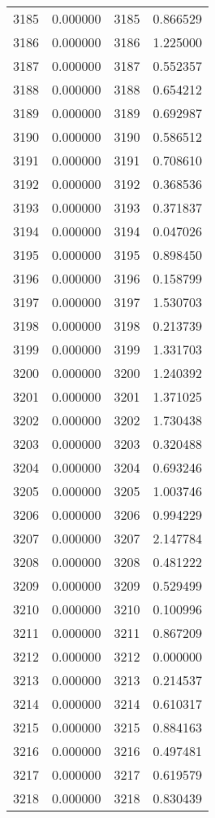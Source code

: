 \documentclass[12pt]{article}
\begin{document}
\begin{longtable}{@{}cccc@{}}
3185 & 0.000000 & 3185 & 0.866529 \\
3186 & 0.000000 & 3186 & 1.225000 \\
3187 & 0.000000 & 3187 & 0.552357 \\
3188 & 0.000000 & 3188 & 0.654212 \\
3189 & 0.000000 & 3189 & 0.692987 \\
3190 & 0.000000 & 3190 & 0.586512 \\
3191 & 0.000000 & 3191 & 0.708610 \\
3192 & 0.000000 & 3192 & 0.368536 \\
3193 & 0.000000 & 3193 & 0.371837 \\
3194 & 0.000000 & 3194 & 0.047026 \\
3195 & 0.000000 & 3195 & 0.898450 \\
3196 & 0.000000 & 3196 & 0.158799 \\
3197 & 0.000000 & 3197 & 1.530703 \\
3198 & 0.000000 & 3198 & 0.213739 \\
3199 & 0.000000 & 3199 & 1.331703 \\
3200 & 0.000000 & 3200 & 1.240392 \\
3201 & 0.000000 & 3201 & 1.371025 \\
3202 & 0.000000 & 3202 & 1.730438 \\
3203 & 0.000000 & 3203 & 0.320488 \\
3204 & 0.000000 & 3204 & 0.693246 \\
3205 & 0.000000 & 3205 & 1.003746 \\
3206 & 0.000000 & 3206 & 0.994229 \\
3207 & 0.000000 & 3207 & 2.147784 \\
3208 & 0.000000 & 3208 & 0.481222 \\
3209 & 0.000000 & 3209 & 0.529499 \\
3210 & 0.000000 & 3210 & 0.100996 \\
3211 & 0.000000 & 3211 & 0.867209 \\
3212 & 0.000000 & 3212 & 0.000000 \\
3213 & 0.000000 & 3213 & 0.214537 \\
3214 & 0.000000 & 3214 & 0.610317 \\
3215 & 0.000000 & 3215 & 0.884163 \\
3216 & 0.000000 & 3216 & 0.497481 \\
3217 & 0.000000 & 3217 & 0.619579 \\
3218 & 0.000000 & 3218 & 0.830439 \\

\end{longtable}
\end{document}

